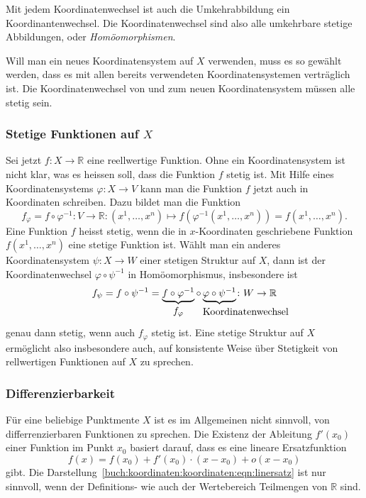 Mit jedem Koordinatenwechsel ist auch die Umkehrabbildung ein
Koordinantenwechsel.
Die Koordinatenwechsel sind also alle umkehrbare stetige Abbildungen,
oder {\em Homöomorphismen}.

Will man ein neues Koordinatensystem auf $X$ verwenden, muss es so
gewählt werden, dass es mit allen bereits verwendeten Koordinatensystemen
verträglich ist.
Die Koordinatenwechsel von und zum neuen Koordinatensystem müssen
alle stetig sein.

%
%
\subsubsection{Stetige Funktionen auf $X$}
Sei jetzt $f\colon X\to\mathbb{R}$ eine reellwertige Funktion.
Ohne ein Koordinatensystem ist nicht klar, was es heissen soll, dass die
Funktion $f$ stetig ist.
Mit Hilfe eines Koordinatensystems $\varphi\colon X\to V$ kann man die
Funktion $f$ jetzt auch in Koordinaten schreiben.
Dazu bildet man die Funktion
\[
f_\varphi
=
f\circ \varphi^{-1}
\colon
V
\to
\mathbb{R}
:
(x^1,\dots,x^n)
\mapsto
f(\varphi^{-1}(x^1,\dots,x^n))
=
f(x^1,\dots,x^n).
\]
Eine Funktion $f$ heisst stetig, wenn die in $x$-Koordinaten geschriebene
Funktion $f(x^1,\dots,x^n)$ eine stetige Funktion ist.
Wählt man ein anderes Koordinatensystem $\psi\colon X\to W$ einer
stetigen Struktur auf $X$, dann ist der Koordinatenwechsel
$\varphi\circ\psi^{-1}$ in Homöomorphismus, insbesondere ist 
\[
f_\psi
=
f\circ\psi^{-1}
=
\underbrace{f\circ\varphi^{-1}}_{\displaystyle f_\varphi\mathstrut}
\circ
\underbrace{\varphi\circ\psi^{-1}}_{\displaystyle
\hbox to6pt{\rlap{\text{Koordinatenwechsel\strut}}\hfill}}
\colon
W\to \mathbb{R}
\]
genau dann stetig, wenn auch $f_\varphi$ stetig ist.
Eine stetige Struktur auf $X$ ermöglicht also insbesondere auch,
auf konsistente Weise über Stetigkeit von rellwertigen Funktionen
auf $X$ zu sprechen.

%
%
\subsubsection{Differenzierbarkeit}
Für eine beliebige Punktmente $X$ ist es im Allgemeinen nicht sinnvoll,
von differrenzierbaren Funktionen zu sprechen.
Die Existenz der Ableitung $f'(x_0)$ einer Funktion im Punkt $x_0$
basiert darauf, dass es eine lineare Ersatzfunktion
\begin{equation}
f(x) = f(x_0) + f'(x_0)\cdot (x-x_0)+o(x-x_0)
\label{buch:koordinaten:koordinaten:eqn:linersatz}
\end{equation}
gibt.
Die Darstellung~\eqref{buch:koordinaten:koordinaten:eqn:linersatz}
ist nur sinnvoll, wenn der Definitions- wie auch der Wertebereich
Teilmengen von $\mathbb{R}$ sind.

